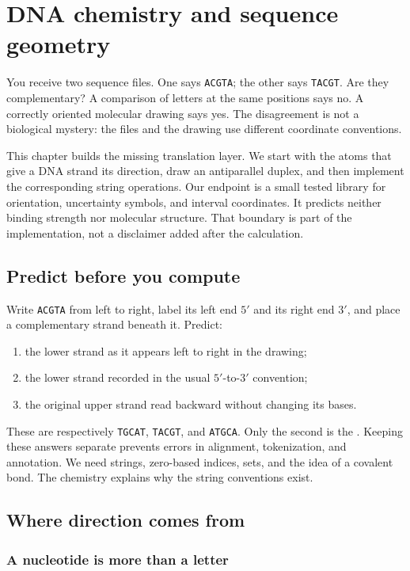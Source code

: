 \chapter{DNA chemistry and sequence geometry}
\label{ch:chemistry}

You receive two sequence files. One says \texttt{ACGTA}; the other says
\texttt{TACGT}. Are they complementary? A comparison of letters at the same
positions says no. A correctly oriented molecular drawing says yes. The
disagreement is not a biological mystery: the files and the drawing use
different coordinate conventions.

This chapter builds the missing translation layer. We start with the atoms
that give a DNA strand its direction, draw an antiparallel duplex, and then
implement the corresponding string operations. Our endpoint is a small
tested library for orientation, uncertainty symbols, and interval coordinates.
It predicts neither binding strength nor molecular structure. That boundary
is part of the implementation, not a disclaimer added after the calculation.

\section{Predict before you compute}

Write \texttt{ACGTA} from left to right, label its left end $5'$ and its
right end $3'$, and place a complementary strand beneath it. Predict:
\begin{enumerate}
\item the lower strand as it appears left to right in the drawing;
\item the lower strand recorded in the usual $5'$-to-$3'$ convention;
\item the original upper strand read backward without changing its bases.
\end{enumerate}
These are respectively \texttt{TGCAT}, \texttt{TACGT}, and \texttt{ATGCA}.
Only the second is the . Keeping these answers
separate prevents errors in alignment, tokenization, and annotation.
We need strings, zero-based indices, sets, and the idea of a covalent bond.
The chemistry explains why the string conventions exist.

\section{Where direction comes from}

\subsection{A nucleotide is more than a letter}

